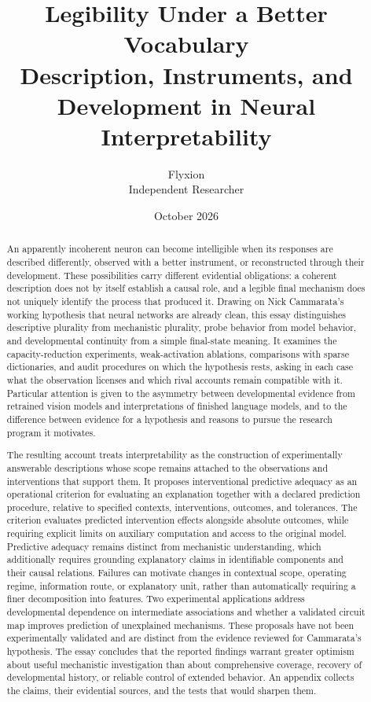\documentclass[11pt]{article}
\title{Legibility Under a Better Vocabulary\\\large Description, Instruments, and Development in Neural Interpretability}
\author{Flyxion\\\normalsize Independent Researcher}
\date{October 2026}
\begin{document}
\maketitle

\begin{abstract}
An apparently incoherent neuron can become intelligible when its responses are described differently, observed with a better instrument, or reconstructed through their development. These possibilities carry different evidential obligations: a coherent description does not by itself establish a causal role, and a legible final mechanism does not uniquely identify the process that produced it. Drawing on Nick Cammarata's working hypothesis that neural networks are already clean, this essay distinguishes descriptive plurality from mechanistic plurality, probe behavior from model behavior, and developmental continuity from a simple final-state meaning. It examines the capacity-reduction experiments, weak-activation ablations, comparisons with sparse dictionaries, and audit procedures on which the hypothesis rests, asking in each case what the observation licenses and which rival accounts remain compatible with it. Particular attention is given to the asymmetry between developmental evidence from retrained vision models and interpretations of finished language models, and to the difference between evidence for a hypothesis and reasons to pursue the research program it motivates.

The resulting account treats interpretability as the construction of experimentally answerable descriptions whose scope remains attached to the observations and interventions that support them. It proposes interventional predictive adequacy as an operational criterion for evaluating an explanation together with a declared prediction procedure, relative to specified contexts, interventions, outcomes, and tolerances. The criterion evaluates predicted intervention effects alongside absolute outcomes, while requiring explicit limits on auxiliary computation and access to the original model. Predictive adequacy remains distinct from mechanistic understanding, which additionally requires grounding explanatory claims in identifiable components and their causal relations. Failures can motivate changes in contextual scope, operating regime, information route, or explanatory unit, rather than automatically requiring a finer decomposition into features. Two experimental applications address developmental dependence on intermediate associations and whether a validated circuit map improves prediction of unexplained mechanisms. These proposals have not been experimentally validated and are distinct from the evidence reviewed for Cammarata's hypothesis. The essay concludes that the reported findings warrant greater optimism about useful mechanistic investigation than about comprehensive coverage, recovery of developmental history, or reliable control of extended behavior. An appendix collects the claims, their evidential sources, and the tests that would sharpen them.
\end{abstract}
\end{document}
